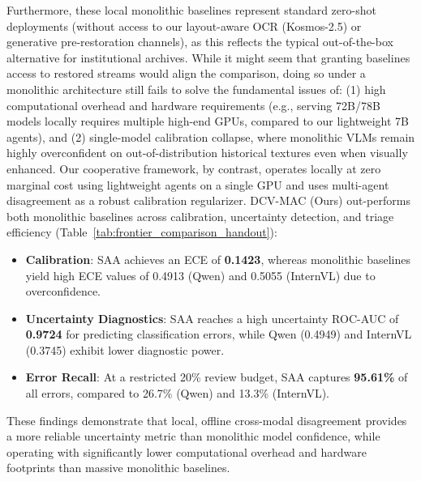 \documentclass[11pt,a4paper]{article}
\newcommand{\term}[1]{\textbf{#1}}
\begin{document}
Furthermore, these local monolithic baselines represent standard zero-shot deployments (without access to our layout-aware OCR (Kosmos-2.5) or generative pre-restoration channels), as this reflects the typical out-of-the-box alternative for institutional archives. While it might seem that granting baselines access to restored streams would align the comparison, doing so under a monolithic architecture still fails to solve the fundamental issues of: (1) high computational overhead and hardware requirements (e.g., serving 72B/78B models locally requires multiple high-end GPUs, compared to our lightweight 7B agents), and (2) single-model calibration collapse, where monolithic VLMs remain highly overconfident on out-of-distribution historical textures even when visually enhanced. Our cooperative framework, by contrast, operates locally at zero marginal cost using lightweight agents on a single GPU and uses multi-agent disagreement as a robust calibration regularizer. DCV-MAC (Ours) out-performs both monolithic baselines across calibration, uncertainty detection, and triage efficiency (Table~\ref{tab:frontier_comparison_handout}):
\begin{itemize}
    \item \term{Calibration}: SAA achieves an ECE of \textbf{0.1423}, whereas monolithic baselines yield high ECE values of 0.4913 (Qwen) and 0.5055 (InternVL) due to overconfidence.
    \item \term{Uncertainty Diagnostics}: SAA reaches a high uncertainty ROC-AUC of \textbf{0.9724} for predicting classification errors, while Qwen (0.4949) and InternVL (0.3745) exhibit lower diagnostic power.
    \item \term{Error Recall}: At a restricted 20\% review budget, SAA captures \textbf{95.61\%} of all errors, compared to 26.7\% (Qwen) and 13.3\% (InternVL).
\end{itemize}
These findings demonstrate that local, offline cross-modal disagreement provides a more reliable uncertainty metric than monolithic model confidence, while operating with significantly lower computational overhead and hardware footprints than massive monolithic baselines.
\end{document}

